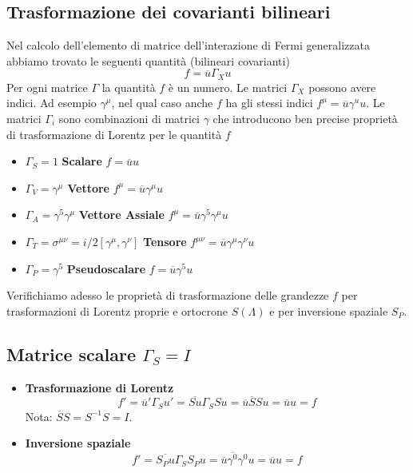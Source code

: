 \subsection{Trasformazione dei covarianti bilineari}
Nel calcolo dell'elemento di matrice dell'interazione di Fermi generalizzata abbiamo trovato le seguenti quantità (bilineari covarianti)
$$
f=\overline{u}\Gamma_Xu
$$
Per ogni matrice $\Gamma$ la quantità $f$ è un numero. Le matrici $\Gamma_X$ possono avere indici. Ad esempio $\gamma^\mu$, nel qual caso anche $f$ ha gli stessi indici $f^\mu=\overline{u}\gamma^uu$. Le matrici $\Gamma_i$ sono combinazioni di matrici $\gamma$ che introducono ben precise proprietà di trasformazione di Lorentz per le quantità $f$
\begin{itemize}
	\item $\Gamma_S = 1$ \hfill \textbf{Scalare} \hfill $f = \overline{u} u$
	\item $\Gamma_V = \gamma^\mu$ \hfill \textbf{Vettore} \hfill $f^\mu = \overline{u} \gamma^\mu u$
	\item $\Gamma_A = \gamma^5 \gamma^\mu$ \hfill \textbf{Vettore Assiale} \hfill $f^\mu = \overline{u} \gamma^5 \gamma^\mu u$
	\item $\Gamma_T = \sigma^{\mu\nu} = i/2 [\gamma^\mu, \gamma^\nu]$ \hfill \textbf{Tensore} \hfill $f^{\mu\nu} = \overline{u} \gamma^\mu \gamma^\nu u$
	\item $\Gamma_P = \gamma^5$ \hfill \textbf{Pseudoscalare} \hfill $f = \overline{u} \gamma^5 u$
\end{itemize}
Verifichiamo adesso le proprietà di trasformazione delle grandezze $f$ per trasformazioni di Lorentz proprie e ortocrone $S(\Lambda)$ e per inversione spaziale $S_P$.
\subsection{Matrice scalare $\Gamma_S = I$}
\begin{itemize}
	\item \textbf{Trasformazione di Lorentz}
	\[
	f' = \overline{u}' \Gamma_S u' = \overline{S u} \Gamma_S S u = \overline{u} \overline{S} S u = \overline{u} u = f
	\]
	Nota: $\overline{S}S = S^{-1}S = I$.
	\item \textbf{Inversione spaziale}
	\[
	f' = \overline{S_P u} \Gamma_S S_P u = \overline{u} \overline{\gamma^0} \gamma^0 u = \overline{u} u = f
	\]
\end{itemize}

